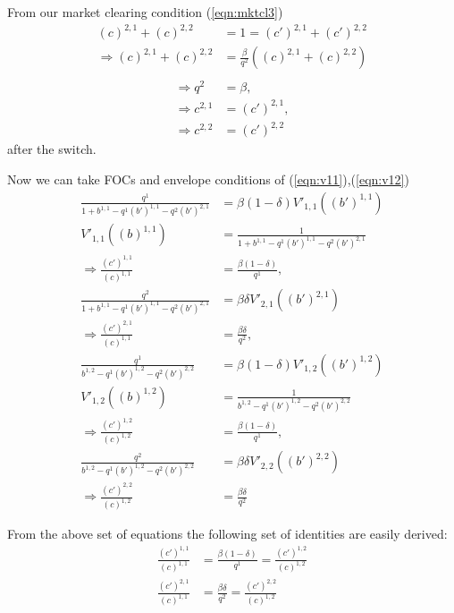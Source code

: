 \documentclass[11pt]{article} %
\begin{document}
From our market clearing condition (\ref{eqn:mktcl3})%
\begin{align*}
(c)^{2,1} + (c)^{2,2} &= 1 = (c')^{2,1} + (c')^{2,2}\\
\Rightarrow (c)^{2,1} + (c)^{2,2} &= \frac{\beta}{q^2}((c)^{2,1} + (c)^{2,2})\\
\end{align*}
\begin{align}
\Rightarrow q^2 &=\beta, \\
\Rightarrow c^{2,1}&=(c')^{2,1},\\
\Rightarrow c^{2,2}&=(c')^{2,2}
\end{align}
after the switch.

Now we can take FOCs and envelope conditions of  (\ref{eqn:v11}),(\ref{eqn:v12})
\begin{align*}
\frac{q^1}{1+b^{1,1} - q^1(b')^{1,1}-  q^2(b')^{2,1}} &= \beta(1-\delta)V'_{1,1}((b')^{1,1})\\
V'_{1,1}((b)^{1,1})&=\frac{1}{1+b^{1,1} - q^1(b')^{1,1}-  q^2(b')^{2,1}}\\
\Rightarrow \frac{(c')^{1,1}}{(c)^{1,1}}&= \frac{\beta(1-\delta)}{q^1},\\
\frac{q^2}{1+b^{1,1} - q^1(b')^{1,1}-  q^2(b')^{2,1}} &= \beta\delta V'_{2,1}((b')^{2,1})\\
\Rightarrow \frac{ (c')^{2,1}}{(c)^{1,1}} &= \frac{\beta\delta}{q^2},\\
\frac{q^1}{b^{1,2} - q^1(b')^{1,2}-  q^2(b')^{2,2}} &= \beta(1-\delta)V'_{1,2}((b')^{1,2})\\
V'_{1,2}((b)^{1,2})&=\frac{1}{b^{1,2} - q^1(b')^{1,2}-  q^2(b')^{2,2}}\\
\Rightarrow \frac{(c')^{1,2}}{(c)^{1,2}}&= \frac{\beta(1-\delta)}{q^1},\\
\frac{q^2}{b^{1,2} - q^1(b')^{1,2}-  q^2(b')^{2,2}} &= \beta\delta V'_{2,2}((b')^{2,2})\\
\Rightarrow \frac{ (c')^{2,2}}{(c)^{1,2}} &= \frac{\beta\delta}{q^2}
\end{align*}

From the above set of equations the following set of identities are easily derived:
\begin{align}
 \frac{(c')^{1,1}}{(c)^{1,1}}&=\frac{\beta(1-\delta)}{q^1} =  \frac{(c')^{1,2}}{(c)^{1,2}}\\
\frac{ (c')^{2,1}}{(c)^{1,1}} &= \frac{\beta\delta}{q^2} = \frac{ (c')^{2,2}}{(c)^{1,2}}
\end{align}
\end{document}
